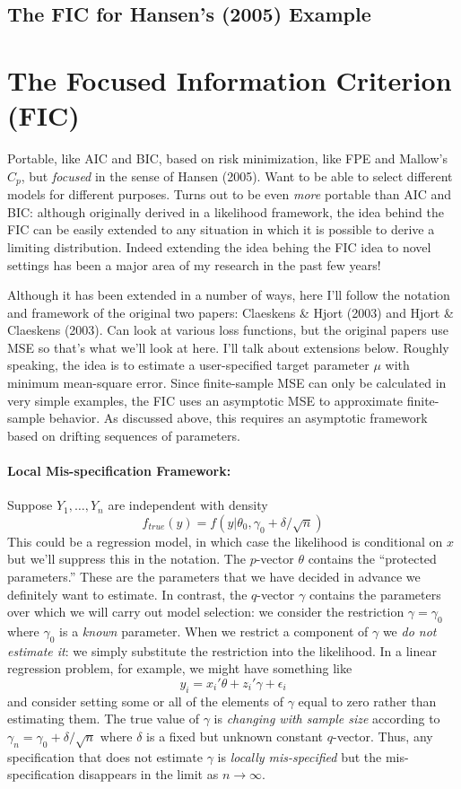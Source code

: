 \documentclass[12pt]{article}
\theoremstyle{definition}
\begin{document}
\subsection{The FIC for Hansen's (2005) Example}



\section{The Focused Information Criterion (FIC)}
Portable, like AIC and BIC, based on risk minimization, like FPE and Mallow's $C_p$, but \emph{focused} in the sense of Hansen (2005). Want to be able to select different models for different purposes. Turns out to be even \emph{more} portable than AIC and BIC: although originally derived in a likelihood framework, the idea behind the FIC can be easily extended to any situation in which it is possible to derive a limiting distribution. Indeed extending the idea behing the FIC idea to novel settings has been a major area of my research in the past few years! 

Although it has been extended in a number of ways, here I'll follow the notation and framework of the original two papers: Claeskens \& Hjort (2003) and Hjort \& Claeskens (2003). Can look at various loss functions, but the original papers use MSE so that's what we'll look at here. I'll talk about extensions below. Roughly speaking, the idea is to estimate a user-specified target parameter $\mu$ with minimum mean-square error. Since finite-sample MSE can only be calculated in very simple examples, the FIC uses an asymptotic MSE to approximate finite-sample behavior. As discussed above, this requires an asymptotic framework based on drifting sequences of parameters. 

\paragraph{Local Mis-specification Framework:}
Suppose $Y_1, \hdots, Y_n$ are independent with density
	$$f_{true}(y)=f(y| \theta_0, \gamma_0 + \delta/\sqrt{n})$$
This could be a regression model, in which case the likelihood is conditional on $x$ but we'll suppress this in the notation. The $p$-vector $\theta$ contains the ``protected parameters.'' These are the parameters that we have decided in advance we definitely want to estimate. In contrast, the $q$-vector $\gamma$ contains the parameters over which we will carry out model selection: we consider the restriction $\gamma = \gamma_0$ where $\gamma_0$ is a \emph{known} parameter. When we restrict a component of $\gamma$ we \emph{do not estimate it}: we simply substitute the restriction into the likelihood. In a linear regression problem, for example, we might have something like
	$$y_i = x_i'\theta + z_i'\gamma + \epsilon_i$$
and consider setting some or all of the elements of $\gamma$ equal to zero rather than estimating them.  The true value of $\gamma$ is \emph{changing with sample size} according to $\gamma_n = \gamma_0 + \delta/\sqrt{n}$ where $\delta$ is a fixed but unknown constant $q$-vector. Thus, any specification that does not estimate $\gamma$ is \emph{locally mis-specified} but the mis-specification disappears in the limit as $n\rightarrow \infty$. 
\end{document}

